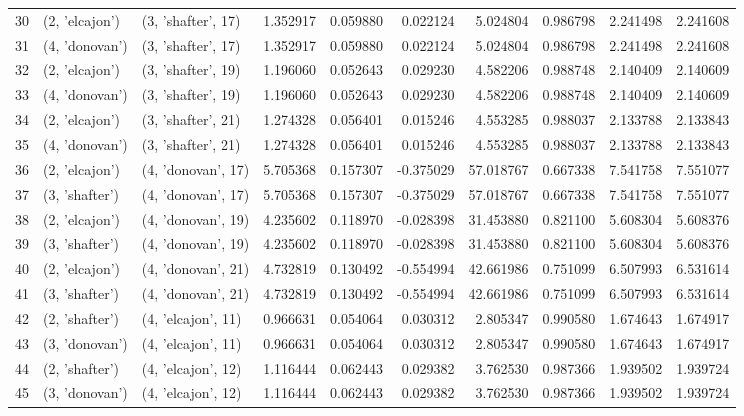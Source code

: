 \begin{tabular}{lllrrrrrrr}
30 &   (2, 'elcajon') &  (3, 'shafter', 17) &  1.352917 &  0.059880 &  0.022124 &   5.024804 &  0.986798 &  2.241498 &  2.241608 \\
31 &   (4, 'donovan') &  (3, 'shafter', 17) &  1.352917 &  0.059880 &  0.022124 &   5.024804 &  0.986798 &  2.241498 &  2.241608 \\
32 &   (2, 'elcajon') &  (3, 'shafter', 19) &  1.196060 &  0.052643 &  0.029230 &   4.582206 &  0.988748 &  2.140409 &  2.140609 \\
33 &   (4, 'donovan') &  (3, 'shafter', 19) &  1.196060 &  0.052643 &  0.029230 &   4.582206 &  0.988748 &  2.140409 &  2.140609 \\
34 &   (2, 'elcajon') &  (3, 'shafter', 21) &  1.274328 &  0.056401 &  0.015246 &   4.553285 &  0.988037 &  2.133788 &  2.133843 \\
35 &   (4, 'donovan') &  (3, 'shafter', 21) &  1.274328 &  0.056401 &  0.015246 &   4.553285 &  0.988037 &  2.133788 &  2.133843 \\
36 &   (2, 'elcajon') &  (4, 'donovan', 17) &  5.705368 &  0.157307 & -0.375029 &  57.018767 &  0.667338 &  7.541758 &  7.551077 \\
37 &   (3, 'shafter') &  (4, 'donovan', 17) &  5.705368 &  0.157307 & -0.375029 &  57.018767 &  0.667338 &  7.541758 &  7.551077 \\
38 &   (2, 'elcajon') &  (4, 'donovan', 19) &  4.235602 &  0.118970 & -0.028398 &  31.453880 &  0.821100 &  5.608304 &  5.608376 \\
39 &   (3, 'shafter') &  (4, 'donovan', 19) &  4.235602 &  0.118970 & -0.028398 &  31.453880 &  0.821100 &  5.608304 &  5.608376 \\
40 &   (2, 'elcajon') &  (4, 'donovan', 21) &  4.732819 &  0.130492 & -0.554994 &  42.661986 &  0.751099 &  6.507993 &  6.531614 \\
41 &   (3, 'shafter') &  (4, 'donovan', 21) &  4.732819 &  0.130492 & -0.554994 &  42.661986 &  0.751099 &  6.507993 &  6.531614 \\
42 &   (2, 'shafter') &  (4, 'elcajon', 11) &  0.966631 &  0.054064 &  0.030312 &   2.805347 &  0.990580 &  1.674643 &  1.674917 \\
43 &   (3, 'donovan') &  (4, 'elcajon', 11) &  0.966631 &  0.054064 &  0.030312 &   2.805347 &  0.990580 &  1.674643 &  1.674917 \\
44 &   (2, 'shafter') &  (4, 'elcajon', 12) &  1.116444 &  0.062443 &  0.029382 &   3.762530 &  0.987366 &  1.939502 &  1.939724 \\
45 &   (3, 'donovan') &  (4, 'elcajon', 12) &  1.116444 &  0.062443 &  0.029382 &   3.762530 &  0.987366 &  1.939502 &  1.939724 \\

\end{tabular}
